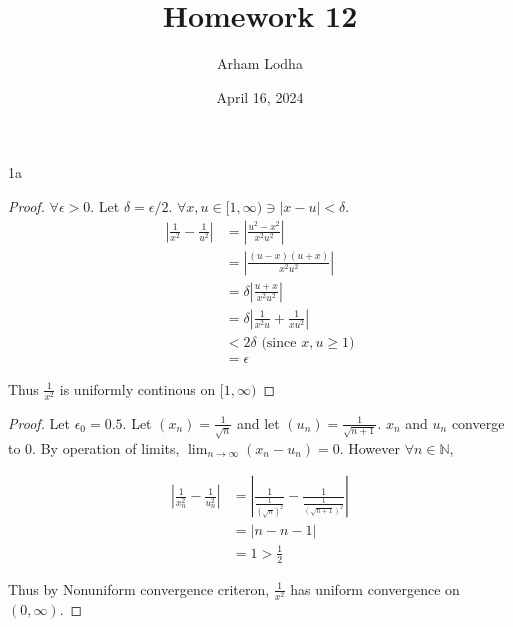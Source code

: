 \documentclass{article}
\newcommand{\N}{\mathbb{N}}
\newcommand{\abs}[1]{\left\lvert #1\right\rvert}
\begin{document}
\title{Homework 12}
\author{Arham Lodha}%
\date{April 16, 2024}%
\maketitle

\begin{PROB}{1a}\label{Problem 1a.}
\end{PROB}
\begin{proof}
    $\forall \epsilon > 0$. Let $\delta = \epsilon / 2$. $\forall x, u \in [1, \infty) \ni \abs{x - u} < \delta$.  
    \begin{align*}
        \abs{ \frac{1}{x^2} - \frac{1}{u^2} } &= \abs{\frac{u^2 - x^2}{x^2 u^2}}
        \\&= \abs{\frac{(u - x)(u + x)}{x^2u^2}}
        \\&= \delta \abs{\frac{u + x}{x^2u^2}}
        \\&= \delta \abs{\frac{1}{x^2 u} + \frac{1}{x u^2}}
        \\&< 2\delta \text{ (since $x, u \geq 1$)}
        \\&= \epsilon
    \end{align*}

    Thus $\frac{1}{x^2}$ is uniformly continous on $[1, \infty)$  
\end{proof}
\begin{PROB}{}\label{Problem .}
\end{PROB}
\begin{proof}
    Let $\epsilon_0 = 0.5$.  
    Let $(x_n) = \frac{1}{\sqrt{n}}$ and let $(u_n) = \frac{1}{\sqrt{n + 1}}$. $x_n$ and $u_n$ converge to 0. By operation of limits, $\lim_{n \to \infty}(x_n - u_n) = 0$. However $\forall n \in \N$, 
    
    \begin{align*}
        \abs{\frac{1}{x_n^2} - \frac{1}{u_n^2}} &= \abs{\frac{1}{\frac{1}{(\sqrt{n})^2}} - \frac{1}{\frac{1}{(\sqrt{n + 1})^2}}} \\
        &= \abs{n - n - 1} \\
        &= 1 > \frac{1}{2}
    \end{align*}

    Thus by Nonuniform convergence criteron, $\frac{1}{x^2}$ has uniform convergence on $(0, \infty)$.  
\end{proof}

\bigskip
\end{document}
